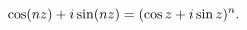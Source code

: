\[\mathop{\cos\/}\nolimits\!\left(nz\right)+i\mathop{\sin\/}\nolimits\!\left(nz%
\right)=(\mathop{\cos\/}\nolimits z+i\mathop{\sin\/}\nolimits z)^{n}.\]